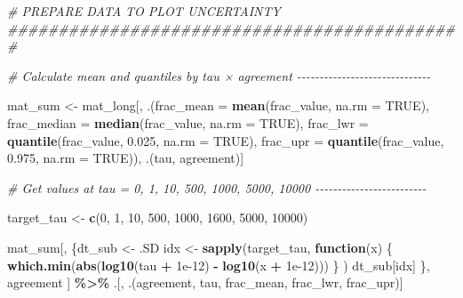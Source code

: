 \documentclass[
  11pt,
]{article}
\newenvironment{Shaded}{\begin{snugshade}}{\end{snugshade}}
\newcommand{\AttributeTok}[1]{\textcolor[rgb]{0.13,0.29,0.53}{#1}}
\newcommand{\CommentTok}[1]{\textcolor[rgb]{0.56,0.35,0.01}{\textit{#1}}}
\newcommand{\ConstantTok}[1]{\textcolor[rgb]{0.56,0.35,0.01}{#1}}
\newcommand{\ControlFlowTok}[1]{\textcolor[rgb]{0.13,0.29,0.53}{\textbf{#1}}}
\newcommand{\DecValTok}[1]{\textcolor[rgb]{0.00,0.00,0.81}{#1}}
\newcommand{\FloatTok}[1]{\textcolor[rgb]{0.00,0.00,0.81}{#1}}
\newcommand{\FunctionTok}[1]{\textcolor[rgb]{0.13,0.29,0.53}{\textbf{#1}}}
\newcommand{\NormalTok}[1]{#1}
\newcommand{\OtherTok}[1]{\textcolor[rgb]{0.56,0.35,0.01}{#1}}
\newcommand{\SpecialCharTok}[1]{\textcolor[rgb]{0.81,0.36,0.00}{\textbf{#1}}}
\begin{document}
\begin{Shaded}
\begin{Highlighting}[]
\CommentTok{\# PREPARE DATA TO PLOT UNCERTAINTY \#\#\#\#\#\#\#\#\#\#\#\#\#\#\#\#\#\#\#\#\#\#\#\#\#\#\#\#\#\#\#\#\#\#\#\#\#\#\#\#\#\#\#\#\#}

\CommentTok{\# Calculate mean and quantiles by tau × agreement {-}{-}{-}{-}{-}{-}{-}{-}{-}{-}{-}{-}{-}{-}{-}{-}{-}{-}{-}{-}{-}{-}{-}{-}{-}{-}{-}{-}{-}{-}}

\NormalTok{mat\_sum }\OtherTok{\textless{}{-}}\NormalTok{ mat\_long[, .(}\AttributeTok{frac\_mean =} \FunctionTok{mean}\NormalTok{(frac\_value, }\AttributeTok{na.rm =} \ConstantTok{TRUE}\NormalTok{),}
                        \AttributeTok{frac\_median =} \FunctionTok{median}\NormalTok{(frac\_value, }\AttributeTok{na.rm =} \ConstantTok{TRUE}\NormalTok{),}
                        \AttributeTok{frac\_lwr =} \FunctionTok{quantile}\NormalTok{(frac\_value, }\FloatTok{0.025}\NormalTok{, }\AttributeTok{na.rm =} \ConstantTok{TRUE}\NormalTok{),}
                        \AttributeTok{frac\_upr =} \FunctionTok{quantile}\NormalTok{(frac\_value, }\FloatTok{0.975}\NormalTok{, }\AttributeTok{na.rm =} \ConstantTok{TRUE}\NormalTok{)),}
\NormalTok{                    .(tau, agreement)]}

\CommentTok{\# Get values at tau = 0, 1, 10, 500, 1000, 5000, 10000 {-}{-}{-}{-}{-}{-}{-}{-}{-}{-}{-}{-}{-}{-}{-}{-}{-}{-}{-}{-}{-}{-}{-}{-}{-}}

\NormalTok{target\_tau }\OtherTok{\textless{}{-}} \FunctionTok{c}\NormalTok{(}\DecValTok{0}\NormalTok{, }\DecValTok{1}\NormalTok{, }\DecValTok{10}\NormalTok{, }\DecValTok{500}\NormalTok{, }\DecValTok{1000}\NormalTok{, }\DecValTok{1600}\NormalTok{, }\DecValTok{5000}\NormalTok{, }\DecValTok{10000}\NormalTok{)}

\NormalTok{mat\_sum[, \{dt\_sub }\OtherTok{\textless{}{-}}\NormalTok{ .SD}
\NormalTok{idx }\OtherTok{\textless{}{-}} \FunctionTok{sapply}\NormalTok{(target\_tau, }\ControlFlowTok{function}\NormalTok{(x) \{}
  \FunctionTok{which.min}\NormalTok{(}\FunctionTok{abs}\NormalTok{(}\FunctionTok{log10}\NormalTok{(tau }\SpecialCharTok{+} \FloatTok{1e{-}12}\NormalTok{) }\SpecialCharTok{{-}} \FunctionTok{log10}\NormalTok{(x }\SpecialCharTok{+} \FloatTok{1e{-}12}\NormalTok{)))}
\NormalTok{      \}}
\NormalTok{    )}
\NormalTok{    dt\_sub[idx]}
\NormalTok{  \},}
\NormalTok{  agreement}
\NormalTok{] }\SpecialCharTok{\%\textgreater{}\%}
\NormalTok{  .[, .(agreement, tau, frac\_mean, frac\_lwr, frac\_upr)]}
\end{Highlighting}
\end{Shaded}
\end{document}
